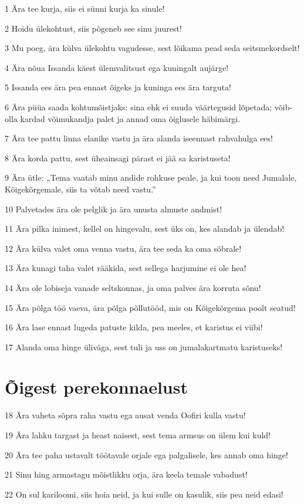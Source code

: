 \par 1 Ära tee kurja, siis ei sünni kurja ka sinule!
\par 2 Hoidu ülekohtust, siis põgeneb see sinu juurest!
\par 3 Mu poeg, ära külva ülekohtu vagudesse, sest lõikama pead seda seitsmekordselt!
\par 4 Ära nõua Issanda käest ülemvalitsust ega kuningalt aujärge!
\par 5 Issanda ees ära pea ennast õigeks ja kuninga ees ära targuta!
\par 6 Ära püüa saada kohtumõistjaks: sina ehk ei suuda väärtegusid lõpetada; võib-olla kardad võimukandja palet ja annad oma õiglusele häbimärgi.
\par 7 Ära tee pattu linna elanike vastu ja ära alanda iseennast rahvahulga ees!
\par 8 Ära korda pattu, sest üheainsagi pärast ei jää sa karistuseta!
\par 9 Ära ütle: „Tema vaatab minu andide rohkuse peale, ja kui toon need Jumalale, Kõigekõrgemale, siis ta võtab need vastu.”
\par 10 Palvetades ära ole pelglik ja ära unusta almuste andmist!
\par 11 Ära pilka inimest, kellel on hingevalu, sest üks on, kes alandab ja ülendab!
\par 12 Ära külva valet oma venna vastu, ära tee seda ka oma sõbrale!
\par 13 Ära kunagi taha valet rääkida, sest sellega harjumine ei ole hea!
\par 14 Ära ole lobiseja vanade seltskonnas, ja oma palves ära korruta sõnu!
\par 15 Ära põlga töö vaeva, ära põlga põllutööd, mis on Kõigekõrgema poolt seatud!
\par 16 Ära lase ennast lugeda patuste kilda, pea meeles, et karistus ei viibi!
\par 17 Alanda oma hinge üliväga, sest tuli ja uss on jumalakartmatu karistuseks!

\section*{Õigest perekonnaelust}

\par 18 Ära vaheta sõpra raha vastu ega ausat venda Oofiri kulla vastu!
\par 19 Ära lahku targast ja heast naisest, sest tema armsus on ülem kui kuld!
\par 20 Ära tee paha ustavalt töötavale orjale ega palgalisele, kes annab oma hinge!
\par 21 Sinu hing armastagu mõistlikku orja, ära keela temale vabadust!
\par 22 On sul kariloomi, siis hoia neid, ja kui sulle on kasulik, siis pea neid edasi!

